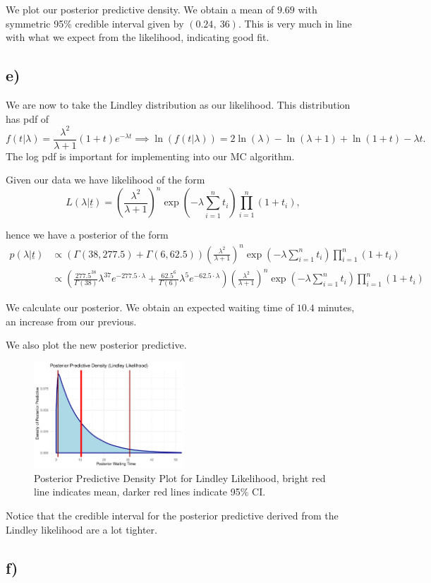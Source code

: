 \documentclass[12pt]{extarticle}
\begin{document}
We plot our posterior predictive density. We obtain a mean of $9.69$ with symmetric 95\% credible interval given by $(0.24, \  36)$. This is very much in line with what we expect from the likelihood, indicating good fit.

\subsection*{e)}
We are now to take the Lindley distribution as our likelihood. This distribution has pdf of
\[
f(t|\lambda) = \frac{\lambda^2}{\lambda+1}(1+t)e^{-\lambda t} \implies \ln(f(t|\lambda)) = 2\ln(\lambda) - \ln(\lambda + 1) + \ln(1+t) - \lambda t.
\]
The log pdf is important for implementing into our MC algorithm.  

Given our data we have likelihood of the form 
\[
L(\lambda|\underline{t}) = \left(\frac{\lambda^2}{\lambda+1}\right)^n\exp\left(-\lambda\sum_{i=1}^{n}t_i\right)\prod_{i=1}^{n}(1+t_i),
\]

hence we have a posterior of the form
\begin{align*}
p(\lambda|\underline{t}) &\propto \left(\Gamma(38, 277.5) + \Gamma(6, 62.5)\right)\left(\frac{\lambda^2}{\lambda+1}\right)^n\exp\left(-\lambda\sum_{i=1}^{n}t_i\right)\prod_{i=1}^{n}(1+t_i)\\
&\propto \left(\frac{277.5^{38}}{\Gamma(38)}\lambda^{37}e^{-277.5\cdot \lambda} + \frac{62.5^6}{\Gamma(6)}\lambda^{5}e^{-62.5\cdot \lambda}\right)\left(\frac{\lambda^2}{\lambda+1}\right)^n\exp\left(-\lambda\sum_{i=1}^{n}t_i\right)\prod_{i=1}^{n}(1+t_i)
\end{align*}

We calculate our posterior. We obtain an expected waiting time of $10.4$ minutes, an increase from our previous.

We also plot the new posterior predictive. 

\begin{figure}[H]
	\centering
	\includegraphics[width = 0.5\textwidth]{../ppredlinddens}
	\caption{Posterior Predictive Density Plot for Lindley Likelihood, bright red line indicates mean, darker red lines indicate 95\% CI.}
	\label{fig:postpredlinddens}
\end{figure}

Notice that the credible interval for the posterior predictive derived from the Lindley likelihood are a lot tighter. 

\subsection*{f)}
\end{document}

